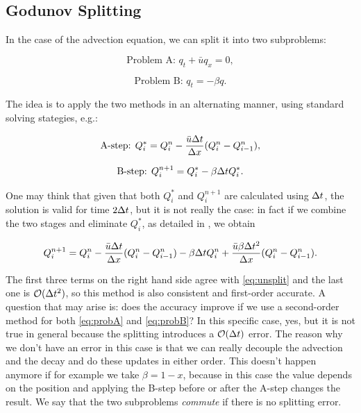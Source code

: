\documentclass[journal,onecolumn]{IEEEtran}
\begin{document}
\subsection{Godunov Splitting}

In the case of the advection equation, we can split it into two subproblems:

\begin{equation}\label{eq:probA}
	\text{Problem A: } q_t+\bar{u}q_x=0,
\end{equation}

\begin{equation}\label{eq:probB}
	\text{Problem B: } q_t = -\beta q.
\end{equation}

The idea is to apply the two methods in an alternating manner, using standard solving stategies, e.g.:

\begin{equation}\label{eq:stepA}
	\text{A-step: } Q_i^* = Q_i^n - \frac{\bar{u}\Delta t}{\Delta x} (Q_i^n-Q_{i-1}^n),
\end{equation}

\begin{equation}\label{eq:stepB}
	\text{B-step: } Q_i^{n+1} = Q_i^*-\beta\Delta tQ_i^*.
\end{equation}

One may think that given that both $Q_i^*$ and $Q_i^{n+1}$ are calculated using $\Delta t$, the solution is valid for time $2\Delta t$, but it is not really the case: in fact if we combine the two stages and eliminate $Q_i^*$, as detailed in \cite{leveque}, we obtain

\begin{equation}
	Q_i^{n+1} = Q_i^n -\frac{\bar{u}\Delta t}{\Delta x}(Q_i^n-Q_{i-1}^n)-\beta\Delta tQ_i^n +\frac{\bar{u}\beta\Delta t^2}{\Delta x}(Q_i^n-Q_{i-1}^n).
\end{equation}

The first three terms on the right hand side agree with \eqref{eq:unsplit} and the last one is $\mathcal{O}(\Delta t^2)$, so this method is also consistent and first-order accurate. A question that may arise is: does the accuracy improve if we use a second-order method for both \eqref{eq:probA} and \eqref{eq:probB}? In this specific case, yes, but it is not true in general because the splitting introduces a $\mathcal{O}(\Delta t)$ error. The reason why we don't have an error in this case is that we can really decouple the advection and the decay and do these updates in either order. This doesn't happen anymore if for example we take $\beta = 1-x$, because in this case the value depends on the position and applying the B-step before or after the A-step changes the result. We say that the two subproblems \textit{commute} if there is no splitting error.
\end{document}
